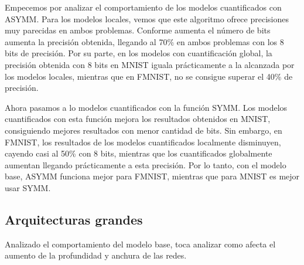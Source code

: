 Empecemos por analizar el comportamiento de los modelos cuantificados con ASYMM. Para los modelos locales, vemos que este algoritmo ofrece precisiones muy parecidas en ambos problemas. Conforme aumenta el número de bits aumenta la precisión obtenida, llegando al 70\% en ambos problemas con los 8 bits de precisión. Por su parte, en los modelos con cuantificación global,  la precisión obtenida con 8 bits en MNIST iguala prácticamente a la alcanzada por los modelos locales, mientras que en FMNIST, no se consigue superar el 40\% de precisión.  

Ahora pasamos a lo modelos cuantificados con la función SYMM. Los modelos cuantificados con esta función mejora los resultados obtenidos en MNIST, consiguiendo mejores resultados con menor cantidad de bits. Sin embargo, en FMNIST, los resultados de los modelos cuantificados localmente disminuyen, cayendo casi al 50\% con 8 bits, mientras que los cuantificados globalmente aumentan llegando prácticamente a esta precisión. Por lo tanto, con el modelo base, ASYMM funciona mejor para FMNIST, mientras que para MNIST es mejor usar SYMM.


\newpage

\subsection{Arquitecturas grandes}
Analizado el comportamiento del modelo base, toca analizar como afecta el aumento de la profundidad y anchura de las redes.

